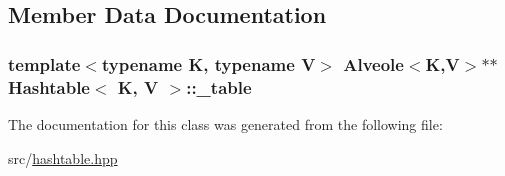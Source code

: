 \subsection{Member Data Documentation}
\hypertarget{class_hashtable_a741b7872f368f468f3b49d687830368a}{
\subsubsection[{\-\_\-table}]{\setlength{\rightskip}{0pt plus 5cm}template$<$typename K, typename V$>$ {\bf Alveole}$<${\bf K},{\bf V}$>$$\ast$$\ast$ {\bf Hashtable}$<$ {\bf K}, {\bf V} $>$\-::\-\_\-table\hspace{0.3cm}{\ttfamily [private]}}}\label{class_hashtable_a741b7872f368f468f3b49d687830368a}


The documentation for this class was generated from the following file\-:\begin{DoxyCompactItemize}
\item 
src/\hyperlink{hashtable_8hpp}{hashtable.\-hpp}\end{DoxyCompactItemize}
